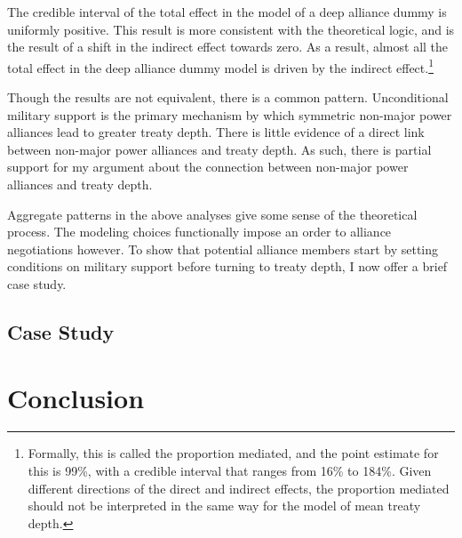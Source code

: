 \documentclass[12pt]{article}
\begin{document}
The credible interval of the total effect in the model of a deep alliance dummy is uniformly positive. 
This result is more consistent with the theoretical logic, and is the result of a shift in the indirect effect towards zero. 
As a result, almost all the total effect in the deep alliance dummy model is driven by the indirect effect.\footnote{Formally, this is called the proportion mediated, and the point estimate for this is 99\%, with a credible interval that ranges from 16\% to 184\%. Given different directions of the direct and indirect effects, the proportion mediated should not be interpreted in the same way for the model of mean treaty depth.}


Though the results are not equivalent, there is a common pattern. 
Unconditional military support is the primary mechanism by which symmetric non-major power alliances lead to greater treaty depth. 
There is little evidence of a direct link between non-major power alliances and treaty depth. 
As such, there is partial support for my argument about the connection between non-major power alliances and treaty depth. 


Aggregate patterns in the above analyses give some sense of the theoretical process. 
The modeling choices functionally impose an order to alliance negotiations however. 
To show that potential alliance members start by setting conditions on military support before turning to treaty depth, I now offer a brief case study. 


\subsection{Case Study}


\section{Conclusion}




\singlespace
 
 
\end{document}
